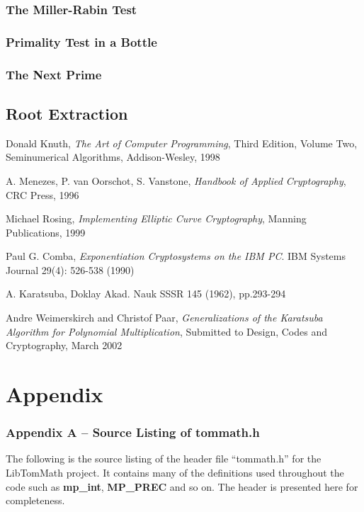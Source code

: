 \documentclass[b5paper]{book}
\begin{document}
\subsection{The Miller-Rabin Test}
\subsection{Primality Test in a Bottle}
\subsection{The Next Prime}
\section{Root Extraction}

\backmatter
\appendix
\begin{thebibliography}{ABCDEF}
Donald Knuth, \textit{The Art of Computer Programming}, Third Edition, Volume Two, Seminumerical Algorithms, Addison-Wesley, 1998

A. Menezes, P. van Oorschot, S. Vanstone, \textit{Handbook of Applied Cryptography}, CRC Press, 1996

Michael Rosing, \textit{Implementing Elliptic Curve Cryptography}, Manning Publications, 1999

Paul G. Comba, \textit{Exponentiation Cryptosystems on the IBM PC}. IBM Systems Journal 29(4): 526-538 (1990)

A. Karatsuba, Doklay Akad. Nauk SSSR 145 (1962), pp.293-294

Andre Weimerskirch and Christof Paar, \textit{Generalizations of the Karatsuba Algorithm for Polynomial Multiplication}, Submitted to Design, Codes and Cryptography, March 2002

\end{thebibliography}



\chapter{Appendix}
\subsection*{Appendix A -- Source Listing of tommath.h}

The following is the source listing of the header file ``tommath.h'' for the LibTomMath project.  It contains many of 
the definitions used throughout the code such as \textbf{mp\_int}, \textbf{MP\_PREC} and so on.  The header is 
presented here for completeness.
\end{document}
